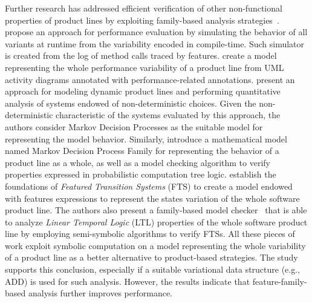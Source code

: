 Further research has addressed efficient verification of other
non-func\-tion\-al properties of product lines by exploiting fam\-i\-ly-based
analysis
strategies~\cite{siegmund_family-based_2013,kowal_scaling_2015,dubslaff_probabilistic_2015,dubslaff_probabilistic_2014,varshosaz_model_2014,
classen2012, classen_featured_2013, Dimovski2015}.
\citet{siegmund_family-based_2013} propose an approach for performance
evaluation by simulating the behavior of all variants at runtime from the
variability encoded in compile-time. Such simulator is created from the log of
method calls traced by features.  \citet{kowal_scaling_2015} create a model
representing the whole performance variability of a product line from UML
activity diagrams annotated with performance-related annotations.
\citet{dubslaff_probabilistic_2015,dubslaff_probabilistic_2014} present an
approach for modeling dynamic product lines and performing quantitative analysis
of systems endowed of non-deterministic choices. Given the non-deterministic
characteristic of the systems evaluated by this approach, the authors consider
Markov Decision Processes as the suitable model for representing the model
behavior. Similarly, \citet{varshosaz_model_2014} introduce a mathematical model
named Markov Decision Process Family for representing the behavior of a product
line as a whole, as well as a model checking algorithm to verify properties
expressed in probabilistic computation tree logic. \citet{classen_featured_2013}
establish the foundations of \emph{Featured Transition Systems} (FTS) to create
a model endowed with features expressions to represent the states variation of
the whole software product line. The authors also present a family-based model
checker~\cite{classen2012} that is able to analyze \emph{Linear Temporal Logic}
(LTL) properties of the whole  software product line by employing semi-symbolic
algorithms to verify FTSs. All these pieces of work exploit symbolic computation
on a model representing the whole variability of a product line as a better
alternative to product-based strategies. The study supports this conclusion,
especially if a suitable variational data structure (e.g., ADD) is used for such
analysis. However, the results indicate that feature-family-based analysis
further improves performance.




